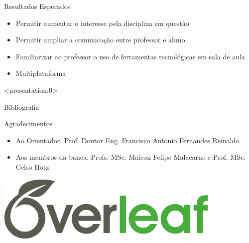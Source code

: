 \documentclass[13pt,xcolor=table]{beamer}
\begin{document}

\begin{frame}
	\begin{lamina}{Resultados Esperados}
		\begin{itemize}
			\item Permitir aumentar o interesse pela disciplina em questão
			\item Permitir ampliar a comunicação entre professor e aluno
			\item Familiarizar ao professor o uso de ferramentas tecnológicas em sala de aula
			\item Multiplataforma
		\end{itemize}
	\end{lamina}
\end{frame}


\begin{frame}<presentation:0>
	\nocite{d1996educaccao}
\end{frame}


\begin{frame}
	\begin{lamina}{Bibliografia}
		
		
	\end{lamina}
\end{frame}


\begin{frame}
	\begin{lamina}{Agradecimentos}
		\begin{itemize}\Large
			\item Ao Orientador, Prof. Doutor Eng. Francisco Antonio Fernandes Reinaldo
			\item Aos membros da banca, Profs. MSc. Maicon Felipe Malacarne e Prof. MSc. Celso Hotz
		\end{itemize}
		\vspace{2pt}
		\centering \includegraphics[keepaspectratio=true,scale=0.25]{overleaf}
	\end{lamina}
\end{frame}
\end{document}
